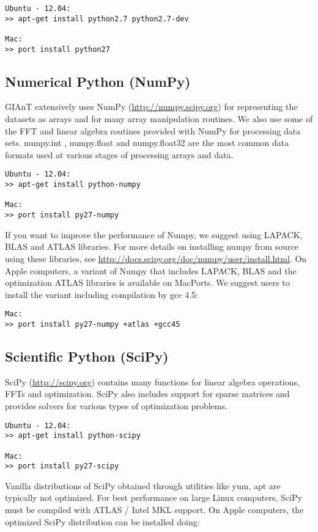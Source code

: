 \begin{verbatim}
Ubuntu - 12.04:
>> apt-get install python2.7 python2.7-dev

Mac:
>> port install python27
\end{verbatim}

\subsection{Numerical Python (NumPy)}
GIAnT extensively uses NumPy (\url{http://numpy.scipy.org}) for representing the datasets as arrays and for many array manipulation routines. We also use some of the FFT and linear algebra routines provided with NumPy for processing data sets. numpy.int , numpy.float and numpy.float32 are the most common data formats used at various stages of processing arrays and data. 
\begin{verbatim}
Ubuntu - 12.04:
>> apt-get install python-numpy

Mac:
>> port install py27-numpy
\end{verbatim}

If you want to improve the performance of Numpy, we suggest using LAPACK, BLAS and ATLAS libraries. For more details on installing numpy from source using these libraries, see \url{http://docs.scipy.org/doc/numpy/user/install.html}. On Apple computers, a variant of Numpy that includes LAPACK, BLAS and the optimization ATLAS libraries is available on MacPorts. We suggest users to install the variant including compilation by gcc 4.5:

\begin{verbatim}
Mac:
>> port install py27-numpy +atlas +gcc45
\end{verbatim}

\subsection{Scientific Python (SciPy)}
SciPy (\url{http://scipy.org}) contains many functions for linear algebra operations, FFTs and optimization. SciPy also includes support for sparse matrices and provides solvers for various types of optimization problems. 
\begin{verbatim}
Ubuntu - 12.04:
>> apt-get install python-scipy

Mac:
>> port install py27-scipy
\end{verbatim}

Vanilla distributions of SciPy obtained through utilities like yum, apt are typically not optimized. For best performance on large Linux computers, SciPy must be compiled with ATLAS / Intel MKL support. On Apple computers, the optimized SciPy distribution can be installed doing:

